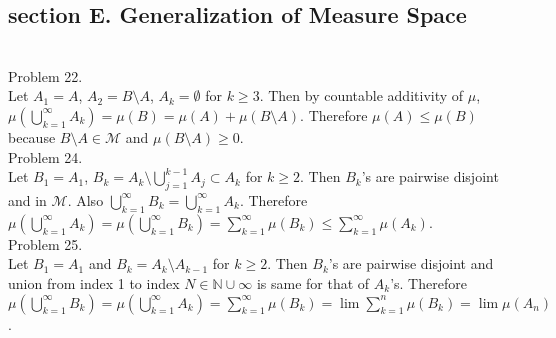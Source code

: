 \subsection*{section E. Generalization of Measure Space} \hfill \\

Problem 22. \\

Let $A_1 = A$, $A_2 = B \setminus A$, $A_k = \emptyset$ for $k \geq 3$. Then by countable additivity of $\mu$,
$\mu\left( \bigcup_{k=1}^{\infty} A_k  \right) = \mu \left( B  \right) = \mu\left( A \right) + \mu\left( B\setminus A \right)$. Therefore $\mu\left( A \right) \leq \mu\left( B \right)$ because $B\setminus A \in \mathcal{M}$ and $\mu\left( B \setminus A \right) \geq 0$. \\

Problem 24. \\

Let $B_1 = A_1 $, $B_k = A_k \setminus \bigcup_{j=1}^{k-1}A_j \subset A_k$ for $k\geq 2$. Then $B_k$'s are pairwise disjoint and in $\mathcal{M}$. Also $\bigcup_{k=1}^{\infty}B_k = \bigcup_{k=1}^{\infty}A_k$.
Therefore $\mu \left( \bigcup_{k=1}^{\infty} A_k  \right) = \mu \left( \bigcup_{k=1}^{\infty} B_k  \right) = \sum_{k=1}^{\infty} \mu\left( B_k \right) \leq \sum_{k=1 }^{\infty}\mu\left( A_k \right)$. \\

Problem 25. \\

Let $B_1 = A_1$ and $B_k = A_k \setminus A_{k-1}$ for $k \geq 2$. Then $B_k$'s are pairwise disjoint and union from index 1 to index $N \in \mathbb{N} \cup \infty $ is same for that of $A_k$'s.
Therefore $\mu\left( \bigcup_{k=1}^{\infty}B_k  \right) = \mu\left( \bigcup_{k=1}^{\infty}A_k \right) = \sum_{k=1}^{\infty}\mu\left( B_k \right) = \lim \sum_{k=1}^n \mu\left( B_k \right) = \lim \mu\left( A_n \right)$. \\
